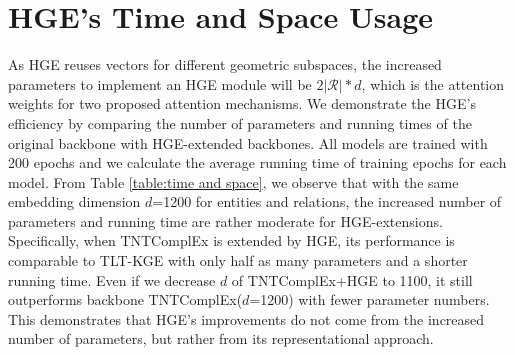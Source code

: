 \documentclass[letterpaper]{article} %
\begin{document}
\section{HGE's Time and Space Usage}
 As HGE reuses vectors for different geometric subspaces, the increased parameters to implement an HGE module will be $2|\mathcal{R}|*d$, which is the attention weights for two proposed attention mechanisms. We demonstrate the HGE's efficiency by comparing the number of parameters and running times of the original backbone with HGE-extended backbones. All models are trained with 200 epochs and we calculate the average running time of training epochs for each model. From Table \ref{table:time and space}, we observe that with the same embedding dimension $d$=1200 for entities and relations, the increased number of parameters and running time are rather moderate for HGE-extensions. Specifically, when TNTComplEx is extended by HGE, its performance is comparable to TLT-KGE with only half as many parameters and a shorter running time. Even if we decrease $d$ of TNTComplEx+HGE to 1100, it still outperforms backbone TNTComplEx($d$=1200) with fewer parameter numbers. This demonstrates that HGE's improvements do not come from the increased number of parameters, but rather from its representational approach.
\end{document}
